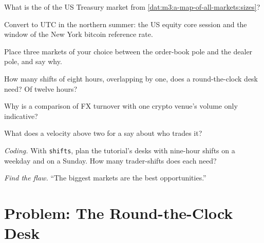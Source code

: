 \begin{exercise}[$\star$]\label{exo:m3:a-map-of-all-markets:1}
What is the  of the US Treasury market from \cref{dat:m3:a-map-of-all-markets:sizes}?
\end{exercise}

\begin{exercise}[$\star$]\label{exo:m3:a-map-of-all-markets:2}
Convert to UTC in the northern summer: the US equity core session and the window of the New York bitcoin reference rate.
\end{exercise}

\begin{exercise}[$\star$]\label{exo:m3:a-map-of-all-markets:3}
Place three markets of your choice between the order-book pole and the dealer pole, and say why.
\end{exercise}

\begin{exercise}[$\star\star$]\label{exo:m3:a-map-of-all-markets:4}
How many shifts of eight hours, overlapping by one, does a round-the-clock desk need? Of twelve hours?
\end{exercise}

\begin{exercise}[$\star\star$]\label{exo:m3:a-map-of-all-markets:5}
Why is a comparison of FX turnover with one crypto venue's volume only indicative?
\end{exercise}

\begin{exercise}[$\star\star$]\label{exo:m3:a-map-of-all-markets:6}
What does a velocity above two for a  say about who trades it?
\end{exercise}

\begin{exercise}[$\star\star\star$]\label{exo:m3:a-map-of-all-markets:7}
\emph{Coding.} With \texttt{shifts}, plan the tutorial's desks with nine-hour shifts on a weekday and on a Sunday. How many trader-shifts does each need?
\end{exercise}

\begin{exercise}[$\star\star\star$]\label{exo:m3:a-map-of-all-markets:8}
\emph{Find the flaw.} ``The biggest markets are the best opportunities.''
\end{exercise}

\section{Problem: The Round-the-Clock Desk}

